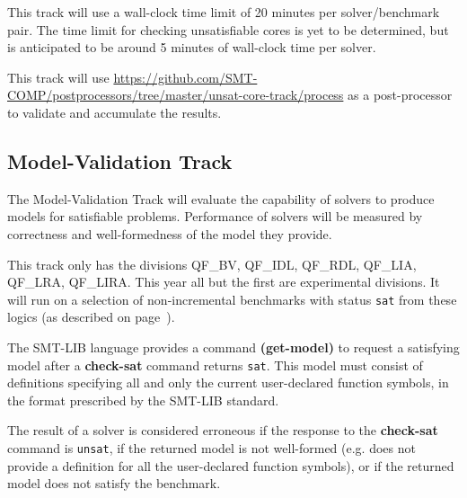 \documentclass[12pt]{article}
\newcommand{\akey}[1]{\textbf{#1}\xspace}
\newcommand{\mvaltrack}{Model-Validation Track\xspace}
\begin{document}
This track will use a wall-clock time limit of 20 minutes per solver/benchmark
pair. The time limit for checking unsatisfiable cores is yet to be determined,
but is anticipated to be around 5 minutes of wall-clock time per solver.

This track will use
{\url{https://github.com/SMT-COMP/postprocessors/tree/master/unsat-core-track/process}}
as a post-processor
to validate and accumulate the results.

\subsection{\mvaltrack}
\label{sec:exec:model}
The \mvaltrack will evaluate the capability of solvers to produce models for
satisfiable problems.  Performance of solvers will be measured by correctness
and well-formedness of the model they provide.

This track only has the divisions
QF\_BV, QF\_IDL, QF\_RDL, QF\_LIA, QF\_LRA, QF\_LIRA.
%
This year all but the first are experimental divisions.
%
It will run on a
selection of non-incremental benchmarks with status \texttt{sat} from these
logics (as described on page~\pageref{benchmark-selection}).

The SMT-LIB language provides a command \akey{(get-model)} to request a
satisfying model after a \akey{check-sat} command returns \texttt{sat}.  This
model must consist of definitions specifying all and only the current
user-declared function symbols, in the format prescribed by the SMT-LIB
standard.

The result of a solver is considered erroneous if the response to the
\akey{check-sat} command is \texttt{unsat}, if the returned model is not
well-formed (e.g. does not provide a definition for all the user-declared
function symbols), or if the returned model does not satisfy the benchmark.
\end{document}
